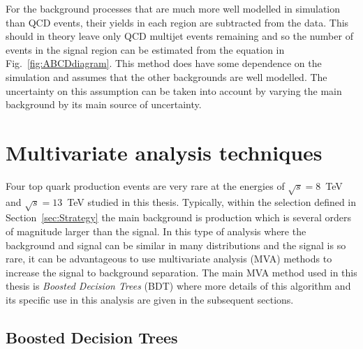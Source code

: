 For the background processes that are much more well modelled in simulation than QCD events, their yields in each region are subtracted from the data. This should in theory leave only QCD multijet events remaining and so the number of events in the signal region can be estimated from the equation in Fig.~\ref{fig:ABCDdiagram}. This method does have some dependence on the simulation and assumes that the other backgrounds are well modelled. The uncertainty on this assumption can be taken into account by varying the main \ttbar background by its main source of uncertainty. 


\section{Multivariate analysis techniques ~\label{sec:MVAtechniques}}

Four top quark production events are very rare at the energies of $\sqrt{s} = 8$~TeV and $\sqrt{s} = 13$~TeV studied in this thesis. Typically, within the selection defined in Section~\ref{sec:Strategy} the main background is \ttbar production which is several orders of magnitude larger than the \tttt signal. In this type of analysis where the background and signal can be similar in many distributions and the signal is so rare, it can be advantageous to use multivariate analysis (MVA) methods to increase the signal to background separation. The main MVA method used in this thesis is \emph{Boosted Decision Trees} (BDT) where more details of this algorithm and its specific use in this analysis are given in the subsequent sections.


\subsection{Boosted Decision Trees}
\label{sec:BDT}

